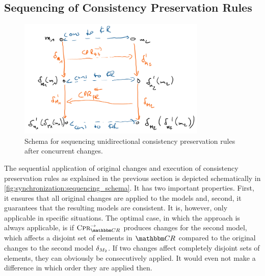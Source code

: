 

\subsection{Sequencing of Consistency Preservation Rules}

\begin{figure}
    \centering
    \includegraphics[width=0.8\textwidth]{figures/correctness/synchronization/sequencing_schema.png}
    \caption[Schema for sequencing unidirectional consistency preservation rules]{Schema for sequencing unidirectional consistency preservation rules after concurrent changes.}
    \label{fig:synchronization:sequencing_schema}
\end{figure}

The sequential application of original changes and execution of consistency preservation rules as explained in the previous section is depicted schematically in \autoref{fig:synchronization:sequencing_schema}.
It has two important properties. 
First, it ensures that all original changes are applied to the models and, second, it guarantees that the resulting models are consistent.
It is, however, only applicable in specific situations.
The optimal case, in which the approach is always applicable, is if $\consistencypreservationrule{\consistencyrelationset{CR}}^{\rightarrow}$ produces changes for the second model, which affects a disjoint set of elements in $\consistencyrelationset{CR}$ compared to the original changes to the second model $\delta_{M_{2}}$.
If two changes affect completely disjoint sets of elements, they can obviously be consecutively applied.
It would even not make a difference in which order they are applied then.

